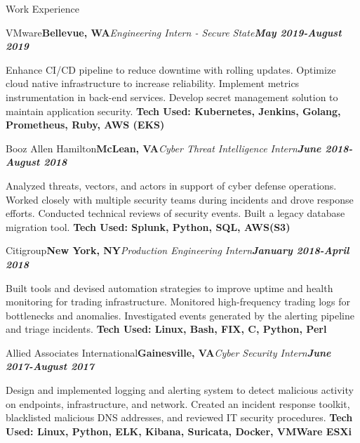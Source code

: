 \documentclass{resume}
\begin{document}
\begin{rSection}{Work Experience}

\begin{rSubsection}{VMware}{\bf Bellevue, WA}{\em \it Engineering Intern - Secure State}{\em \bf May 2019-August 2019}
\item Enhance CI/CD pipeline to reduce downtime with rolling updates. Optimize cloud native infrastructure to increase reliability. Implement metrics instrumentation in back-end services. Develop secret management solution to maintain application security. 
{\bf Tech Used: Kubernetes, Jenkins, Golang, Prometheus, Ruby, AWS (EKS)}
\end{rSubsection}

\begin{rSubsection}{Booz Allen Hamilton}{\bf McLean, VA}{\em \it Cyber Threat Intelligence Intern}{\em \bf June 2018-August 2018}
\item Analyzed threats, vectors, and actors in support of cyber defense operations. Worked closely with multiple security teams during incidents and drove response efforts. Conducted technical reviews of security events. Built a legacy database migration tool.
{\bf Tech Used: Splunk, Python, SQL, AWS(S3)}
\end{rSubsection}

\begin{rSubsection}{Citigroup}{\bf New York, NY}{\em \it Production Engineering Intern}{\em \bf January 2018-April 2018}
\item Built tools and devised automation strategies to improve uptime and health monitoring for trading infrastructure. Monitored high-frequency trading logs for bottlenecks and anomalies. Investigated events generated by the alerting pipeline and triage incidents.
{\bf Tech Used: Linux, Bash, FIX, C, Python, Perl}
\end{rSubsection}

\begin{rSubsection}{Allied Associates International}{\bf Gainesville, VA}{\em \it Cyber Security Intern}{\em \bf June 2017-August 2017}
\item Design and implemented logging and alerting system to detect malicious activity on endpoints, infrastructure, and network. Created an incident response toolkit, blacklisted malicious DNS addresses, and reviewed IT security procedures. 
{\bf Tech Used: Linux, Python, ELK, Kibana, Suricata, Docker, VMWare ESXi}
\end{rSubsection}

\end{rSection}
\end{document}
